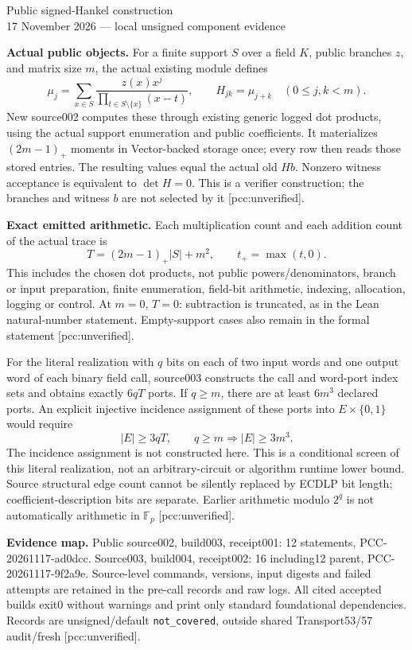 \documentclass[10pt]{article}
\begin{document}
\begin{center}{\Large Public signed-Hankel construction}\\[4pt]
17 November 2026 --- local unsigned component evidence\end{center}
\textbf{Actual public objects.} For a finite support $S$ over a field $K$,
public branches $z$, and matrix size $m$, the actual existing module defines
\[
 \mu_j=\sum_{x\in S}\frac{z(x)x^j}{\prod_{t\in S\setminus\{x\}}(x-t)},
 \qquad H_{jk}=\mu_{j+k}\quad(0\le j,k<m).
\]
New source002 computes these through existing generic logged dot products,
using the actual support enumeration and public coefficients. It materializes
$(2m-1)_+$ moments in Vector-backed storage once; every row then reads those
stored entries. The resulting values equal the actual old $H b$.
Nonzero witness acceptance is equivalent to $\det H=0$. This is a verifier
construction; the branches and witness $b$ are not selected by it
[pcc:unverified].

\textbf{Exact emitted arithmetic.} Each multiplication count and each
addition count of the actual trace is
\[
 T=(2m-1)_+|S|+m^2,\qquad t_+=\max(t,0).
\]
This includes the chosen dot products, not public powers/denominators,
branch or input preparation, finite enumeration, field-bit arithmetic,
indexing, allocation, logging or control. At $m=0$, $T=0$: subtraction is truncated, as in the Lean natural-number statement. Empty-support cases also
remain in the formal statement [pcc:unverified].

For the literal realization with $q$ bits on each of two input words and
one output word of each binary field call, source003 constructs the call
and word-port index sets and obtains exactly $6qT$ ports. If $q\ge m$,
there are at least $6m^3$ declared ports. An explicit injective incidence
assignment of these ports into $E\times\{0,1\}$ would require
\[
 |E|\ge3qT,\qquad q\ge m\Longrightarrow |E|\ge3m^3.
\]
The incidence assignment is not constructed here. This is a conditional
screen of this literal realization, not an arbitrary-circuit or algorithm
runtime lower bound. Source structural edge count cannot be silently
replaced by ECDLP bit length; coefficient-description bits are separate.
Earlier arithmetic modulo $2^q$ is not automatically arithmetic in
$\mathbb F_p$ [pcc:unverified].

\textbf{Evidence map.} Public source002, build003, receipt001:
12 statements, PCC-20261117-ad0dcc. Source003, build004, receipt002:
16 including12 parent, PCC-20261117-9f2a9e. Source-level commands, versions,
input digests and failed attempts are retained in the pre-call records and
raw logs. All cited accepted builds exit0 without warnings and print only
standard foundational dependencies. Records are unsigned/default
\texttt{not\_covered}, outside shared Transport53/57 audit/fresh
[pcc:unverified].
\end{document}
